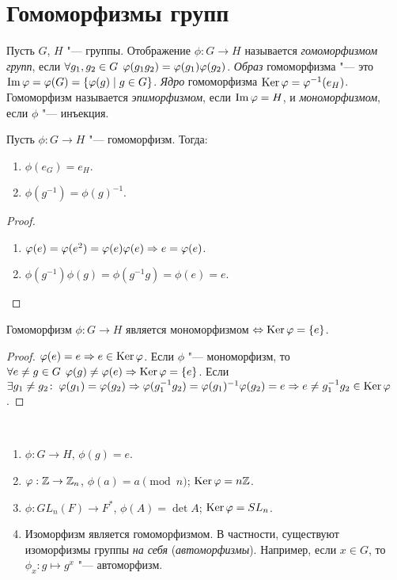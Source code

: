 \documentclass[main]{subfiles}
\begin{document}
\section{Гомоморфизмы групп}

\begin{definition}
  Пусть $G$, $H$ "--- группы. Отображение $\phi : G \to H$ называется
  \emph{гомоморфизмом групп}, если $\forall {g_1, g_2 \in G} \; \,
  \varphi(g_1 g_2) = \varphi(g_1) \varphi(g_2)$.
  \emph{Образ} гомоморфизма "--- это
  $\operatorname{Im} \varphi = \varphi(G) = \{ \varphi(g) \mid g \in G \}$.
  \emph{Ядро} гомоморфизма $\operatorname{Ker} \varphi = \varphi^{-1}(e_H)$.
  Гомоморфизм называется \emph{эпиморфизмом}, если $\operatorname{Im} \varphi = H$, и
  \emph{мономорфизмом}, если $\phi$ "--- инъекция.
\end{definition}

\begin{proposition}
  Пусть $\phi : G \to H$ "--- гомоморфизм. Тогда:
  \begin{enumerate}
    \item $\phi(e_G) = e_H$.
    \item $\phi(g^{-1}) = \phi(g)^{-1}$.
  \end{enumerate}
\end{proposition}
\begin{proof}~
  \begin{enumerate}
    \item $\varphi(e) = \varphi(e^2) = \varphi(e) \varphi(e) \Rightarrow e = \varphi(e)$.
    \item $\phi(g^{-1})\phi(g) = \phi(g^{-1}g) = \phi(e) = e$.
  \end{enumerate}
\end{proof}

\begin{proposition}
  Гомоморфизм $\phi : G \to H$ является мономорфизмом $\Leftrightarrow \operatorname{Ker} \varphi = \{e\}$.
\end{proposition}
\begin{proof}
  $\varphi(e) = e \Rightarrow e \in \operatorname{Ker} \varphi$. Если $\phi$ "--- мономорфизм, то
  $\forall {e \ne g \in G} \; \, \varphi(g) \ne \varphi(e) \Rightarrow \operatorname{Ker} \varphi = \{e\}$.
  Если $\exists g_1 \ne  g_2 \colon \: \varphi(g_1) = \varphi(g_2) \Rightarrow \varphi(g_1^{-1} g_2)
  = \varphi(g_1)^{-1} \varphi(g_2) = e \Rightarrow e \ne g_1^{-1} g_2 \in \operatorname{Ker} \varphi$.
\end{proof}

\begin{examples}~
  \begin{enumerate}
    \item $\phi : G \to H$, $\phi(g) = e$.
    \item $\varphi : \mathbb{Z} \to \mathbb{Z}_n$, $\phi(a) = a \pmod{n}$;
      $\operatorname{Ker} \varphi = n \mathbb{Z}$.
    \item $\phi : GL_n(F) \to F^*$, $\phi(A) = \det A$; $\operatorname{Ker} \varphi = SL_n$.
    \item Изоморфизм является гомоморфизмом. В частности, существуют изоморфизмы
      группы \emph{на себя} (\emph{автоморфизмы}). Например, если $x \in G$, то
      $\phi_x : g \mapsto g^x$ "--- автоморфизм.
  \end{enumerate}
\end{examples}
\end{document}
